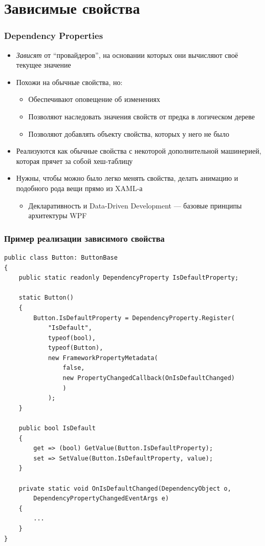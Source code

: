 \documentclass[xetex,mathserif,serif]{beamer}
\begin{document}
    \section{Зависимые свойства}

    \begin{frame}
        \frametitle{Dependency Properties}
        \begin{itemize}
            \item \textit{Зависят} от ``провайдеров'', на основании которых они вычисляют своё текущее значение
            \item Похожи на обычные свойства, но:
            \begin{itemize}
                \item Обеспечивают оповещение об изменениях
                \item Позволяют наследовать значения свойств от предка в логическом дереве
                \item Позволяют добавлять объекту свойства, которых у него не было
            \end{itemize}
            \item Реализуются как обычные свойства с некоторой дополнительной машинерией, которая прячет за собой хеш-таблицу
            \item Нужны, чтобы можно было легко менять свойства, делать анимацию и подобного рода вещи прямо из XAML-а
            \begin{itemize}
                \item Декларативность и Data-Driven Development --- базовые принципы архитектуры WPF
            \end{itemize}
        \end{itemize}
    \end{frame}

    \begin{frame}[fragile]
        \frametitle{Пример реализации зависимого свойства}
        \begin{tiny}
            \begin{verbatim}
public class Button: ButtonBase
{
    public static readonly DependencyProperty IsDefaultProperty;

    static Button()
    {
        Button.IsDefaultProperty = DependencyProperty.Register(
            "IsDefault",
            typeof(bool),
            typeof(Button),
            new FrameworkPropertyMetadata(
                false, 
                new PropertyChangedCallback(OnIsDefaultChanged)
                )
            );
    }

    public bool IsDefault
    {
        get => (bool) GetValue(Button.IsDefaultProperty);
        set => SetValue(Button.IsDefaultProperty, value);
    }

    private static void OnIsDefaultChanged(DependencyObject o, 
        DependencyPropertyChangedEventArgs e)
    {
        ...
    }
}
            \end{verbatim}
        \end{tiny}
    \end{frame}
\end{document}
